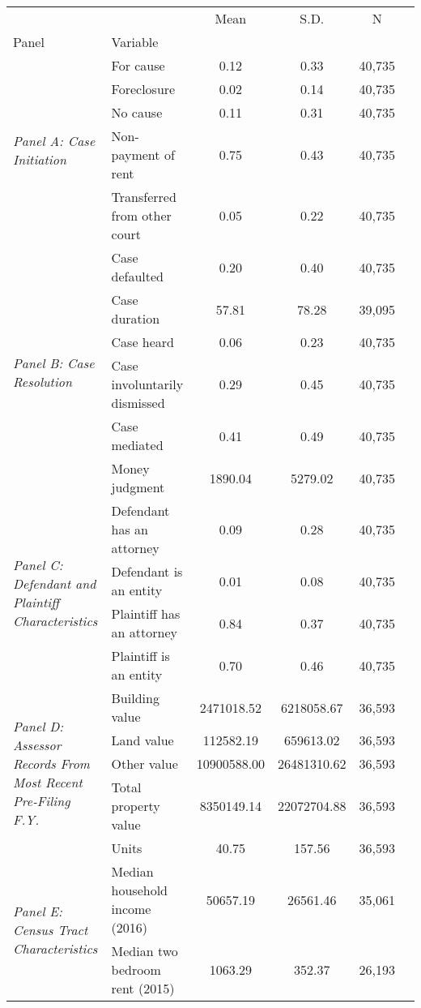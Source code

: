 \begin{tabular}{llcccc}
\toprule
 &  & Mean & S.D. & N \\
Panel & Variable &  &  &  \\
\midrule
\multirow[c]{5}{4cm}{\textit{Panel A: Case Initiation}} & For cause & 0.12 & 0.33 & 40,735 \\
 & Foreclosure & 0.02 & 0.14 & 40,735 \\
 & No cause & 0.11 & 0.31 & 40,735 \\
 & Non-payment of rent & 0.75 & 0.43 & 40,735 \\
 & Transferred from other court & 0.05 & 0.22 & 40,735 \\
\cline{1-5}
\multirow[c]{6}{4cm}{\textit{Panel B: Case Resolution}} & Case defaulted & 0.20 & 0.40 & 40,735 \\
 & Case duration & 57.81 & 78.28 & 39,095 \\
 & Case heard & 0.06 & 0.23 & 40,735 \\
 & Case involuntarily dismissed & 0.29 & 0.45 & 40,735 \\
 & Case mediated & 0.41 & 0.49 & 40,735 \\
 & Money judgment & 1890.04 & 5279.02 & 40,735 \\
\cline{1-5}
\multirow[c]{4}{4cm}{\textit{Panel C: Defendant and Plaintiff Characteristics}} & Defendant has an attorney & 0.09 & 0.28 & 40,735 \\
 & Defendant is an entity & 0.01 & 0.08 & 40,735 \\
 & Plaintiff has an attorney & 0.84 & 0.37 & 40,735 \\
 & Plaintiff is an entity & 0.70 & 0.46 & 40,735 \\
\cline{1-5}
\multirow[c]{5}{4cm}{\textit{Panel D: Assessor Records From Most Recent Pre-Filing F.Y.}} & Building value & 2471018.52 & 6218058.67 & 36,593 \\
 & Land value & 112582.19 & 659613.02 & 36,593 \\
 & Other value & 10900588.00 & 26481310.62 & 36,593 \\
 & Total property value & 8350149.14 & 22072704.88 & 36,593 \\
 & Units & 40.75 & 157.56 & 36,593 \\
\cline{1-5}
\multirow[c]{4}{4cm}{\textit{Panel E: Census Tract Characteristics}} & Median household income (2016) & 50657.19 & 26561.46 & 35,061 \\
 & Median two bedroom rent (2015) & 1063.29 & 352.37 & 26,193 \\

\end{tabular}
